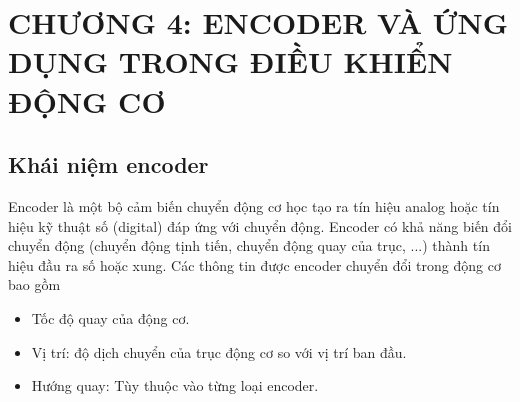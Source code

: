 \chapter{CHƯƠNG 4: ENCODER VÀ ỨNG DỤNG TRONG ĐIỀU KHIỂN ĐỘNG CƠ}
    \section{Khái niệm encoder}
        Encoder là một bộ cảm biến chuyển động cơ học tạo ra tín hiệu analog hoặc tín hiệu kỹ thuật số (digital) đáp ứng với chuyển động. Encoder có khả năng biến đổi chuyển động (chuyển động tịnh tiến, chuyển động quay của trục, ...) thành tín hiệu đầu ra số hoặc xung. Các thông tin được encoder chuyển đổi trong động cơ bao gồm
        \begin{itemize}
            \item Tốc độ quay của động cơ.
            \item Vị trí: độ dịch chuyển của trục động cơ so với vị trí ban đầu.
            \item Hướng quay: Tùy thuộc vào từng loại encoder.
        \end{itemize}


